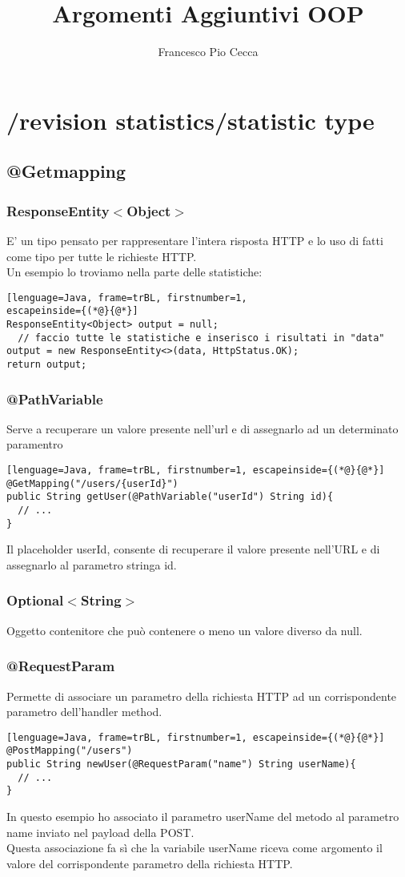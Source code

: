 \documentclass{article}
\title{Argomenti Aggiuntivi OOP}
\author{Francesco Pio Cecca}
\begin{document}
\maketitle
\section{/revision statistics/{statistic type}}
\subsection{@Getmapping}
\subsubsection{ResponseEntity$<$Object$>$}
E' un tipo pensato per rappresentare l'intera risposta HTTP e lo uso di fatti come tipo per tutte le richieste HTTP.\\
Un esempio lo troviamo nella parte delle statistiche:
\begin{lstlisting}[lenguage=Java, frame=trBL, firstnumber=1,
escapeinside={(*@}{@*}]
ResponseEntity<Object> output = null;
  // faccio tutte le statistiche e inserisco i risultati in "data"
output = new ResponseEntity<>(data, HttpStatus.OK);
return output;
\end{lstlisting}
\subsubsection{@PathVariable}
Serve a recuperare un valore presente nell'url e di assegnarlo ad un determinato paramentro
\begin{lstlisting}[lenguage=Java, frame=trBL, firstnumber=1, escapeinside={(*@}{@*}]
@GetMapping("/users/{userId}")
public String getUser(@PathVariable("userId") String id){
  // ...
}
\end{lstlisting}
Il placeholder {userId}, consente di recuperare il valore presente nell’URL e di assegnarlo al parametro stringa id.
\subsubsection{Optional$<$String$>$}
Oggetto contenitore che può contenere o meno un valore diverso da null.
\subsubsection{@RequestParam}
Permette di associare un parametro della richiesta HTTP ad un corrispondente parametro dell’handler method.
\begin{lstlisting}[lenguage=Java, frame=trBL, firstnumber=1, escapeinside={(*@}{@*}]
@PostMapping("/users")
public String newUser(@RequestParam("name") String userName){
  // ...
}
\end{lstlisting}
In questo esempio ho associato il parametro userName del metodo al parametro name inviato nel payload della POST. \\
Questa associazione fa sì che la variabile userName riceva come argomento il valore del corrispondente parametro della richiesta HTTP.
\end{document}
